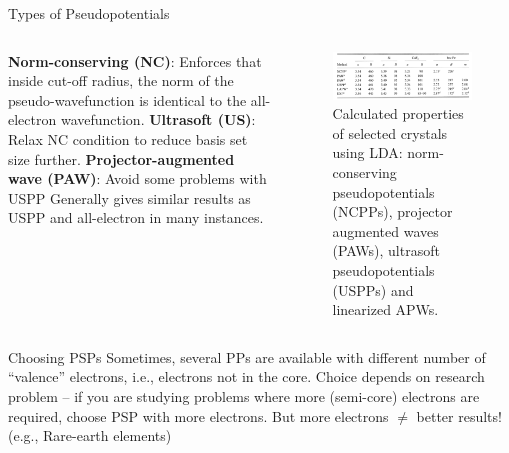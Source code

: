 \documentclass[aspectratio=169]{beamer}
\begin{document}
\begin{frame}{Types of Pseudopotentials}

\begin{columns}
\textbf{Norm-conserving (NC)}: Enforces that inside cut-off radius, the norm of the pseudo-wavefunction is identical to the all-electron wavefunction.\newline
\newline
\textbf{Ultrasoft (US)}: Relax NC condition to reduce basis set size further.\newline
\newline
\textbf{Projector-augmented wave (PAW)}: Avoid some problems with USPP
Generally gives similar results as USPP and all-electron in many instances.\cite{kresseUltrasoftPseudopotentialsProjector1999}
\begin{figure}
    \centering
        \includegraphics[width=\linewidth]{lectures/figures/7_PSP_comparison.png}
    \caption{Calculated properties of selected crystals using LDA: norm-conserving pseudopotentials (NCPPs), projector augmented waves (PAWs), ultrasoft pseudopotentials (USPPs) and linearized APWs.}
\end{figure} 

\end{columns} 

\end{frame} 

\begin{frame}{Choosing PSPs}
Sometimes, several PPs are available with different number of ``valence'' electrons, i.e., electrons not in the core.\newline
\newline
Choice depends on research problem – if you are studying problems where more (semi-core) electrons are required, choose PSP with more electrons.\newline
\newline
But more electrons $\neq$ better results! (e.g., Rare-earth elements)

\end{frame} 
\end{document}
